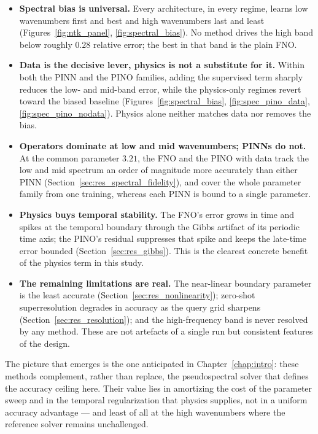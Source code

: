 \begin{itemize}
    \item \textbf{Spectral bias is universal.} Every architecture, in every regime, learns low wavenumbers first and best and high wavenumbers last and least (Figures~\ref{fig:ntk_panel}, \ref{fig:spectral_bias}). No method drives the high band below roughly $0.28$ relative error; the best in that band is the plain FNO.

    \item \textbf{Data is the decisive lever, physics is not a substitute for it.} Within both the PINN and the PINO families, adding the supervised term sharply reduces the low- and mid-band error, while the physics-only regimes revert toward the biased baseline (Figures~\ref{fig:spectral_bias}, \ref{fig:spec_pino_data}, \ref{fig:spec_pino_nodata}). Physics alone neither matches data nor removes the bias.

    \item \textbf{Operators dominate at low and mid wavenumbers; PINNs do not.} At the common parameter $3.21$, the FNO and the PINO with data track the low and mid spectrum an order of magnitude more accurately than either PINN (Section~\ref{sec:res_spectral_fidelity}), and cover the whole parameter family from one training, whereas each PINN is bound to a single parameter.

    \item \textbf{Physics buys temporal stability.} The FNO's error grows in time and spikes at the temporal boundary through the Gibbs artifact of its periodic time axis; the PINO's residual suppresses that spike and keeps the late-time error bounded (Section~\ref{sec:res_gibbs}). This is the clearest concrete benefit of the physics term in this study.

    \item \textbf{The remaining limitations are real.} The near-linear boundary parameter is the least accurate (Section~\ref{sec:res_nonlinearity}); zero-shot superresolution degrades in accuracy as the query grid sharpens (Section~\ref{sec:res_resolution}); and the high-frequency band is never resolved by any method. These are not artefacts of a single run but consistent features of the design.
\end{itemize}

The picture that emerges is the one anticipated in Chapter~\ref{chap:intro}: these methods complement, rather than replace, the pseudospectral solver that defines the accuracy ceiling here. Their value lies in amortizing the cost of the parameter sweep and in the temporal regularization that physics supplies, not in a uniform accuracy advantage --- and least of all at the high wavenumbers where the reference solver remains unchallenged.
